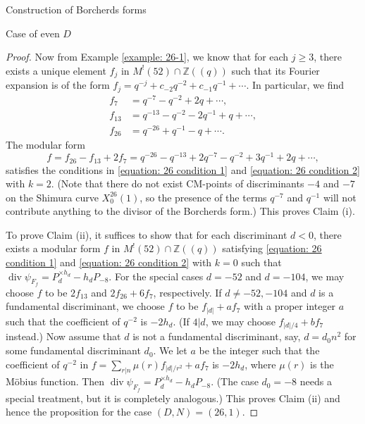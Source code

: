 \documentclass{amsart}
\theoremstyle{definition}
\def\Z{\mathbb Z}
\def\div{\operatorname{div}}
\begin{document}
\begin{section}{Construction of Borcherds forms}
\begin{subsection}{Case of even $D$}
\begin{proof}
  Now from Example \ref{example: 26-1}, we know that for each $j\ge
  3$, there exists a unique element $f_j$ in $M^!(52)\cap\Z((q))$ such
  that its Fourier expansion is of the form
  $f_j=q^{-j}+c_{-2}q^{-2}+c_{-1}q^{-1}+\cdots$. In particular, we find
  \begin{equation*}
  \begin{split}
    f_7&=q^{-7}-q^{-2}+2q+\cdots,\\
    f_{13}&=q^{-13}-q^{-2}-2q^{-1}+q+\cdots, \\
    f_{26}&=q^{-26}+q^{-1}-q+\cdots.
  \end{split}
  \end{equation*}
  The modular form
  $$
    f=f_{26}-f_{13}+2f_7=q^{-26}-q^{-13}+2q^{-7}-q^{-2}+3q^{-1}+2q+\cdots,
  $$
  satisfies the conditions in \eqref{equation: 26 condition 1} and
  \eqref{equation: 26 condition 2} with $k=2$. (Note that there do not
  exist CM-points of discriminants $-4$ and $-7$ on the Shimura curve
  $X_0^{26}(1)$, so the presence of the terms $q^{-7}$ and $q^{-1}$
  will not contribute anything to the divisor of the Borcherds form.)
  This proves Claim (i).

  To prove Claim (ii), it suffices to show that for each discriminant
  $d<0$, there exists a modular form $f$ in $M^!(52)\cap\Z((q))$
  satisfying \eqref{equation: 26 condition 1} and \eqref{equation: 26
    condition 2} with $k=0$ such that $\div\psi_{F_f}=P_d^{\times
    h_d}-h_dP_{-8}$. For the special cases $d=-52$ and $d=-104$, we
  may choose $f$ to be $2f_{13}$ and $2f_{26}+6f_7$, respectively. If
  $d\neq-52,-104$ and $d$ is a fundamental discriminant, we choose
  $f$ to be $f_{|d|}+af_7$ with a proper integer $a$ such that the
  coefficient of $q^{-2}$ is $-2h_d$. (If $4|d$, we may choose
  $f_{|d|/4}+bf_7$ instead.) Now assume that $d$ is not a fundamental
  discriminant, say, $d=d_0n^2$ for some fundamental discriminant
  $d_0$. We let $a$ be the integer such that the coefficient of
  $q^{-2}$ in $f=\sum_{r|n}\mu(r)f_{|d|/r^2}+af_7$ is $-2h_d$, where
  $\mu(r)$ is the M\"obius function. Then $\div\psi_{F_f}=P_d^{\times
    h_d}-h_dP_{-8}$. (The case $d_0=-8$ needs a special treatment, but
  it is completely analogous.) This proves Claim (ii) and hence the
  proposition for the case $(D,N)=(26,1)$. 
\end{proof}

\end{subsection}


\end{section}
\end{document}
